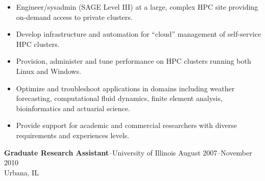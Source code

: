 \documentclass[10pt]{article}
\newcommand{\jobitem}[4]{
    \vspace{4pt}

    \textbf{#1}--#2 \hfill #3\\ #4

    \vspace{-8pt}
}
\begin{document}
\begin{itemize}\setlength{\itemsep}{0cm}
  \setlength{\parskip}{0cm}

\item Engineer/sysadmin (SAGE Level III) at a large, complex HPC site providing on-demand access to private clusters.
\item Develop infrastructure and automation for ``cloud'' management of self-service HPC clusters.
\item Provision, administer and tune performance on HPC clusters running both Linux and Windows.
\item Optimize and troubleshoot applications in domains including weather forecasting, 
computational fluid dynamics, finite element analysis, bioinformatics and actuarial science.
\item Provide support for academic and commercial researchers with diverse requirements and experiences levels.

\end{itemize}


\jobitem{Graduate Research Assistant}{University of Illinois}{August 2007--November 2010}{Urbana, IL}
\end{document}
